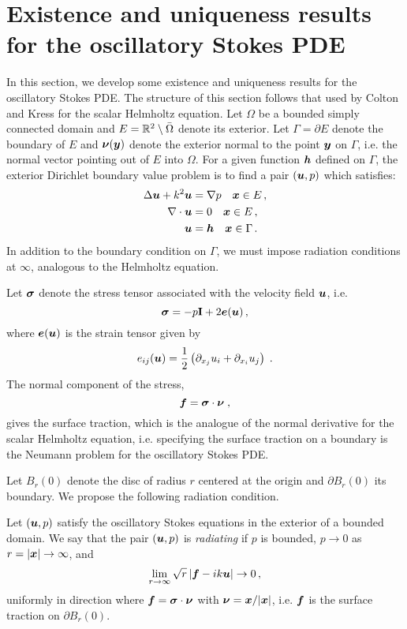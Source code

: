 \section{Existence and uniqueness results for the oscillatory Stokes PDE}

In this section, we develop some existence and uniqueness
results for the oscillatory Stokes PDE.
%
The structure of this section follows that used
by Colton and Kress \cite[Ch. 3]{colton1983integral}
for the scalar Helmholtz equation.
%
Let $\Omega$ be a bounded simply connected
domain and $E = \mathbb{R}^{2} \setminus \bar{\Omega}$ denote its
exterior.
%
Let $\Gamma = \partial E$ denote the boundary of $E$ and
${\boldsymbol \nu}({\boldsymbol y})$ denote the exterior normal to the point ${\boldsymbol y}$ on
$\Gamma$, i.e. the normal vector pointing out of $E$ into $\Omega$.
%
For a given function ${\boldsymbol h}$ defined on $\Gamma$,
the exterior Dirichlet boundary value problem is to
find a pair $({\boldsymbol u},p)$ which satisfies:
\begin{align}
\Delta {\boldsymbol u} + k^{2} {\boldsymbol u} &= \nabla p \quad {\boldsymbol x} \in E \, ,\label{eq:helmstokes_ext}\\
\nabla \cdot {\boldsymbol u} &= 0 \quad {\boldsymbol x} \in E \, , \\
{\boldsymbol u} &= {\boldsymbol h} \quad {\boldsymbol x} \in \Gamma \, .
\end{align}
In addition to the boundary condition on
$\Gamma$, we must impose radiation conditions
at $\infty$, analogous to the Helmholtz equation.
%

Let ${\boldsymbol \sigma}$ denote the stress tensor associated with the velocity
field ${\boldsymbol u}$, i.e.
\begin{equation}
{\boldsymbol \sigma} = -p {\bf I} + 2 {\boldsymbol e}({\boldsymbol u}) \, ,
\end{equation}
where ${\boldsymbol e}({\boldsymbol u})$ is the strain tensor given by
\begin{equation}
e_{ij}({\boldsymbol u}) = \frac{1}{2} \left( \partial_{x_j} u_i + \partial_{x_i} u_j \right) \; .
\end{equation}
%
The normal component of the stress,
\begin{equation}
{\boldsymbol f} = {\boldsymbol \sigma} \cdot {\boldsymbol \nu} \; ,
\end{equation}
gives the surface traction, which is the analogue of
the normal derivative for the scalar Helmholtz equation,
i.e. specifying the surface traction on a boundary is
the Neumann problem for the oscillatory Stokes PDE.

%
Let $B_r(0)$ denote the disc of radius $r$ centered
at the origin and $\partial B_r(0)$ its boundary.
%
We propose the following radiation condition.

\begin{definition} \label{def:radcond}
Let $({\boldsymbol u},p)$ satisfy the oscillatory Stokes equations in
the exterior of a bounded domain. We say that
the pair $({\boldsymbol u},p)$ is {\em radiating} if
$p$ is bounded, $p \to 0$ as $r = |{\boldsymbol x}| \to \infty$, and 
\begin{equation}
\lim_{r\to \infty} \sqrt{r} \left| {\boldsymbol f} - i k {\boldsymbol u} \right| \to 0 \, ,
\label{eq:radcond}
\end{equation}
uniformly in direction where ${\boldsymbol f} = {\boldsymbol \sigma} \cdot {\boldsymbol \nu}$
with ${\boldsymbol \nu} = {\boldsymbol x}/|{\boldsymbol x}|$, i.e. ${\boldsymbol f}$ is the surface
traction on $\partial B_r(0)$.     
\end{definition}

